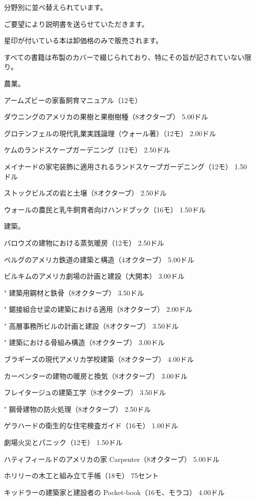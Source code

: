 \documentclass[a4paper,11pt,openany]{ltjsbook}
\begin{document}
分野別に並べ替えられています。

ご要望により説明書を送らせていただきます。

星印が付いている本は卸価格のみで販売されます。

すべての書籍は布製のカバーで綴じられており、特にその旨が記されていない限り。

農業。

アームズビーの家畜飼育マニュアル（12モ）

ダウニングのアメリカの果樹と果樹樹種（8オクターブ） 5.00ドル

グロテンフェルの現代乳業実践論理（ウォール著）（12モ） 2.00ドル

ケムのランドスケープガーデニング（12モ） 2.50ドル

メイナードの家宅装飾に適用されるランドスケープガーデニング（12モ） 1.50ドル

ストックビルズの岩と土壌（8オクターブ） 2.50ドル

ウォールの農民と乳牛飼育者向けハンドブック（16モ） 1.50ドル

建築。

バロウズの建物における蒸気暖房（12モ） 2.50ドル

ベルグのアメリカ鉄道の建築と構造（4オクターブ） 5.00ドル

ビルキムのアメリカ劇場の計画と建設（大開本） 3.00ドル

"         建築用鋼材と鉄骨（8オクターブ） 3.50ドル

"         鋸接組合せ梁の建築における適用（8オクターブ） 2.00ドル

"         高層事務所ビルの計画と建設（8オクターブ） 3.50ドル

"         建築における骨組み構造（8オクターブ） 3.00ドル

ブラギーズの現代アメリカ学校建築（8オクターブ） 4.00ドル

カーペンターの建物の暖房と換気（8オクターブ） 3.00ドル

フレイタージュの建築工学（8オクターブ） 3.50ドル

"         鋼骨建物の防火処理（8オクターブ） 2.50ドル

ゲラハードの衛生的な住宅検査ガイド（16モ） 1.00ドル

劇場火災とパニック（12モ） 1.50ドル

ハティフィールドのアメリカの家 Carpenter（8オクターブ） 5.00ドル

ホリリーの木工と組み立て手帳（18モ） 75セント

キッドラーの建築家と建設者の Pocket-book（16モ、モラコ） 4.00ドル
\end{document}
